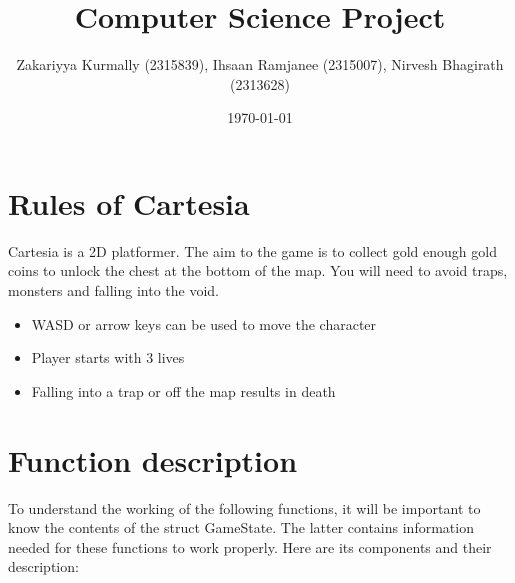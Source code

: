 \documentclass{article}
\title{Computer Science Project}
\author{Zakariyya Kurmally (2315839), Ihsaan Ramjanee (2315007), Nirvesh Bhagirath (2313628)}
\date{\today}
\begin{document}
\maketitle
\tableofcontents
\pagebreak
\section{Rules of Cartesia}
Cartesia is a 2D platformer. The aim to the game is to collect
gold enough gold coins to unlock the chest at the bottom of the 
map. You will need to avoid traps, monsters and falling into the void. 

\begin{itemize}
    \item WASD or arrow keys can be used to move the character
    \item Player starts with 3 lives
    \item Falling into a trap or off the map results in death
\end{itemize}

\section{Function description}
To understand the working of the following functions, it will be important 
to know the contents of the struct GameState. The latter contains information 
needed for these functions to work properly. Here are its components and their
description:
\end{document}
